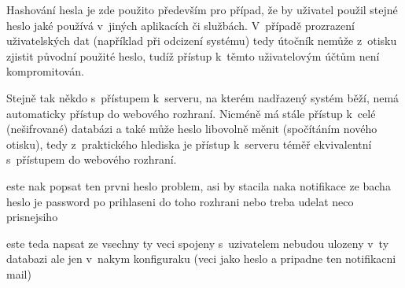 Hashování hesla je zde použito především pro případ, že by uživatel použil stejné heslo jaké používá v~jiných aplikacích či službách. V~případě prozrazení uživatelských dat (například při odcizení systému) tedy útočník nemůže z~otisku zjistit původní použité heslo, tudíž přístup k~těmto uživatelovým účtům není kompromitován.

Stejně tak někdo s~přístupem k~serveru, na kterém nadřazený systém běží, nemá automaticky přístup do webového rozhraní. Nicméně má stále přístup k~celé (nešifrované) databázi a také může heslo libovolně měnit (spočítáním nového otisku), tedy z~praktického hlediska je přístup k~serveru téměř ekvivalentní s~přístupem do webového rozhraní.

este nak popsat ten prvni heslo problem, asi by stacila naka notifikace ze bacha heslo je password po prihlaseni do toho rozhrani nebo treba udelat neco prisnejsiho

este teda napsat ze vsechny ty veci spojeny s~uzivatelem nebudou ulozeny v~ty databazi ale jen v~nakym konfiguraku (veci jako heslo a pripadne ten notifikacni mail)

